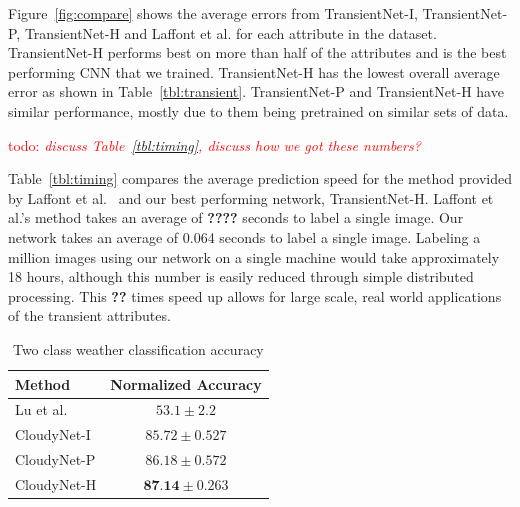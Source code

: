 \documentclass[10pt,twocolumn,letterpaper]{article}
\newcommand{\todo}[1]{\textcolor{red}{todo: {\em #1}}}
\newcommand{\figref}[1]{Figure~\ref{fig:#1}}
\newcommand{\tblref}[1]{Table~\ref{tbl:#1}}
\begin{document}
\figref{compare} shows the average errors from TransientNet-I, TransientNet-P,
TransientNet-H and Laffont et al. for each attribute in the dataset.
TransientNet-H performs best on more than half of the attributes and is the
best performing CNN that we trained.  TransientNet-H has the lowest overall
average error as shown in \tblref{transient}.  TransientNet-P and
TransientNet-H have similar performance, mostly due to them being pretrained on
similar sets of data.

\todo{discuss \tblref{timing}, discuss how we got these numbers?}

\tblref{timing} compares the average prediction speed for the method provided
by Laffont et al.~\cite{Laffont14} and our best performing network,
TransientNet-H.  Laffont et al.'s method takes an average of \textbf{????}
seconds to label a single image.  Our network takes an average of 0.064 seconds
to label a single image.  Labeling a million images using our network on a
single machine would take approximately 18 hours, although this number is
easily reduced through simple distributed processing.  This \textbf{??} times
speed up allows for large scale, real world applications of the transient
attributes.


%

\begin{table}[t]
	\centering
	\begin{tabular}{ | l | c | }
		\hline
			Method & Normalized Accuracy \\ \hline \hline
			Lu et al.~\cite{lutwoclass}& $ 53.1 \pm 2.2 $ \\ \hline
			CloudyNet-I & $ 85.72 \pm 0.527 $ \\ \hline
			CloudyNet-P & $ 86.18 \pm 0.572 $ \\ \hline
			CloudyNet-H & $ \textbf{87.14} \pm 0.263 $ \\ 
		\hline
	\end{tabular}
	\caption{Two class weather classification accuracy}
	\label{tbl:twoclass}
\end{table}
\end{document}

